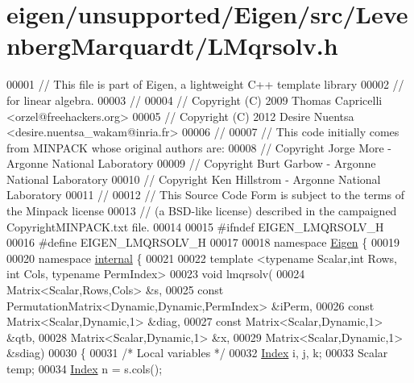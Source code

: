 \hypertarget{eigen_2unsupported_2_eigen_2src_2_levenberg_marquardt_2_l_mqrsolv_8h_source}{}\section{eigen/unsupported/\+Eigen/src/\+Levenberg\+Marquardt/\+L\+Mqrsolv.h}
\label{eigen_2unsupported_2_eigen_2src_2_levenberg_marquardt_2_l_mqrsolv_8h_source}

\begin{DoxyCode}
00001 \textcolor{comment}{// This file is part of Eigen, a lightweight C++ template library}
00002 \textcolor{comment}{// for linear algebra.}
00003 \textcolor{comment}{//}
00004 \textcolor{comment}{// Copyright (C) 2009 Thomas Capricelli <orzel@freehackers.org>}
00005 \textcolor{comment}{// Copyright (C) 2012 Desire Nuentsa <desire.nuentsa\_wakam@inria.fr>}
00006 \textcolor{comment}{//}
00007 \textcolor{comment}{// This code initially comes from MINPACK whose original authors are:}
00008 \textcolor{comment}{// Copyright Jorge More - Argonne National Laboratory}
00009 \textcolor{comment}{// Copyright Burt Garbow - Argonne National Laboratory}
00010 \textcolor{comment}{// Copyright Ken Hillstrom - Argonne National Laboratory}
00011 \textcolor{comment}{//}
00012 \textcolor{comment}{// This Source Code Form is subject to the terms of the Minpack license}
00013 \textcolor{comment}{// (a BSD-like license) described in the campaigned CopyrightMINPACK.txt file.}
00014 
00015 \textcolor{preprocessor}{#ifndef EIGEN\_LMQRSOLV\_H}
00016 \textcolor{preprocessor}{#define EIGEN\_LMQRSOLV\_H}
00017 
00018 \textcolor{keyword}{namespace }\hyperlink{namespace_eigen}{Eigen} \{ 
00019 
00020 \textcolor{keyword}{namespace }\hyperlink{namespaceinternal}{internal} \{
00021 
00022 \textcolor{keyword}{template} <\textcolor{keyword}{typename} Scalar,\textcolor{keywordtype}{int} Rows, \textcolor{keywordtype}{int} Cols, \textcolor{keyword}{typename} PermIndex>
00023 \textcolor{keywordtype}{void} lmqrsolv(
00024   Matrix<Scalar,Rows,Cols> &s,
00025   \textcolor{keyword}{const} PermutationMatrix<Dynamic,Dynamic,PermIndex> &iPerm,
00026   \textcolor{keyword}{const} Matrix<Scalar,Dynamic,1> &diag,
00027   \textcolor{keyword}{const} Matrix<Scalar,Dynamic,1> &qtb,
00028   Matrix<Scalar,Dynamic,1> &x,
00029   Matrix<Scalar,Dynamic,1> &sdiag)
00030 \{
00031     \textcolor{comment}{/* Local variables */}
00032     \hyperlink{namespace_eigen_a62e77e0933482dafde8fe197d9a2cfde}{Index} i, j, k;
00033     Scalar temp;
00034     \hyperlink{namespace_eigen_a62e77e0933482dafde8fe197d9a2cfde}{Index} n = s.cols();

\end{DoxyCode}
